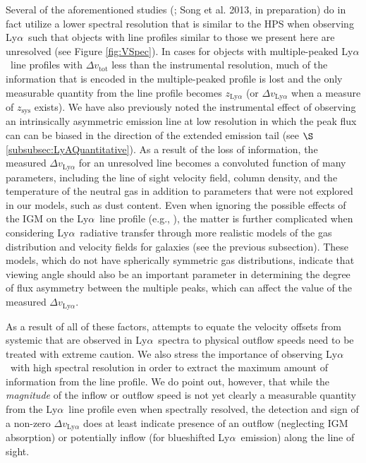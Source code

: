 \documentclass{emulateapj}
\newcommand{\lya}{Ly$\alpha$}
\begin{document}
Several of the aforementioned studies (\citealp{mclinden2011,finkelstein2011,guaita2013}; Song et al. 2013, in preparation) do in fact utilize a lower spectral resolution that is similar to the HPS when observing \lya\ such that objects with line profiles similar to those we present here are unresolved (see Figure \ref{fig:VSpec}). In cases for objects with multiple-peaked \lya\ line profiles with $\Delta v_{\mathrm{tot}}$ less than the instrumental resolution, much of the information that is encoded in the multiple-peaked profile is lost and the only measurable quantity from the line profile becomes $z_{\mathrm{Ly}\alpha}$ (or $\Delta v_{\mathrm{Ly}\alpha}$ when a measure of $z_{\mathrm{sys}}$ exists). We have also previously noted the instrumental effect of observing an intrinsically asymmetric emission line at low resolution in which the peak flux can can be biased in the direction of the extended emission tail (see $\S$\ref{subsubsec:LyAQuantitative}). As a result of the loss of information, the measured $\Delta v_{\mathrm{Ly}\alpha}$ for an unresolved line becomes a convoluted function of many parameters, including the line of sight velocity field, column density, and the temperature of the neutral gas in addition to parameters that were not explored in our models, such as dust content. Even when ignoring the possible effects of the IGM on the \lya\ line profile (e.g., \citealp{dijkstra2006b,laursen2011}), the matter is further complicated when considering \lya\ radiative transfer through more realistic models of the gas distribution and velocity fields for galaxies (see the previous subsection). These models, which do not have spherically symmetric gas distributions, indicate that viewing angle should also be an important parameter in determining the degree of flux asymmetry between the multiple peaks, which can affect the value of the measured $\Delta v_{\mathrm{Ly}\alpha}$. 

As a result of all of these factors, attempts to equate the velocity offsets from systemic that are observed in \lya\ spectra to physical outflow speeds need to be treated with extreme caution. We also stress the importance of observing \lya\ with high spectral resolution in order to extract the maximum amount of information from the line profile. We do point out, however, that while the \textit{magnitude} of the inflow or outflow speed is not yet clearly a measurable quantity from the \lya\ line profile even when spectrally resolved, the detection and sign of a non-zero $\Delta v_{\mathrm{Ly}\alpha}$ does at least indicate presence of an outflow (neglecting IGM absorption) or potentially inflow (for blueshifted \lya\ emission) along the line of sight. 
\end{document}

